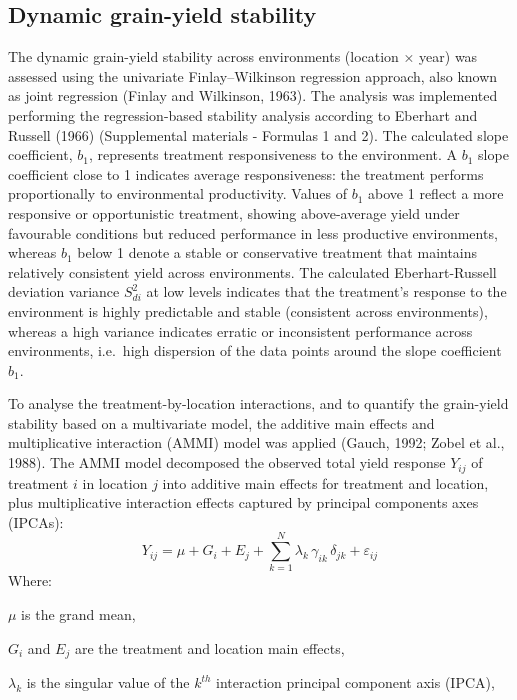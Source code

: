 \documentclass[
  british,
  a4paper,
  DIV=11,
  numbers=noendperiod]{scrreprt}
\begin{document}
\subsection{Dynamic grain-yield
stability}\label{dynamic-grain-yield-stability}

The dynamic grain-yield stability across environments (location × year)
was assessed using the univariate Finlay--Wilkinson regression approach,
also known as joint regression (Finlay and Wilkinson, 1963). The
analysis was implemented performing the regression-based stability
analysis according to Eberhart and Russell (1966) (Supplemental
materials - Formulas 1 and 2). The calculated slope coefficient,
\(b_{1}\), represents treatment responsiveness to the environment. A
\(b_{1}\) slope coefficient close to 1 indicates average responsiveness:
the treatment performs proportionally to environmental productivity.
Values of \(b_{1}\) above 1 reflect a more responsive or opportunistic
treatment, showing above-average yield under favourable conditions but
reduced performance in less productive environments, whereas \(b_{1}\)
below 1 denote a stable or conservative treatment that maintains
relatively consistent yield across environments. The calculated
Eberhart-Russell deviation variance \(S^2_{di}\) at low levels indicates
that the treatment's response to the environment is highly predictable
and stable (consistent across environments), whereas a high variance
indicates erratic or inconsistent performance across environments,
i.e.~high dispersion of the data points around the slope coefficient
\(b_{1}\).

To analyse the treatment-by-location interactions, and to quantify the
grain-yield stability based on a multivariate model, the additive main
effects and multiplicative interaction (AMMI) model was applied (Gauch,
1992; Zobel et al., 1988). The AMMI model decomposed the observed total
yield response \(Y_{ij}\)\hspace{0pt} of treatment \(i\) in location
\(j\) into additive main effects for treatment and location, plus
multiplicative interaction effects captured by principal components axes
(IPCAs): \[
Y_{ij} = \mu + G_i + E_j + \sum_{k=1}^{N} \lambda_k \, \gamma_{ik} \, \delta_{jk} + \varepsilon_{ij} \tag{4}
\] Where:

\(\mu\) is the grand mean,

\(G_i\) and \(E_j\) are the treatment and location main effects,

\(\lambda_k\) is the singular value of the \(k^{th}\) interaction
principal component axis (IPCA),
\end{document}
